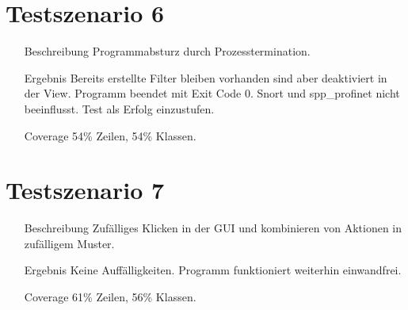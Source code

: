 \section{Testszenario 6}

\begin{enumerate}[leftmargin = *, align=parleft, labelsep=3cm]
  \item[Beschreibung] Programmabsturz durch Prozesstermination.
  \item[Ergebnis] Bereits erstellte Filter bleiben vorhanden sind aber deaktiviert in der View. Programm beendet mit Exit Code 0. Snort und spp\_profinet nicht beeinflusst. Test als Erfolg einzustufen.
  \item[Coverage] 54\% Zeilen, 54\% Klassen.
\end{enumerate} 

\section{Testszenario 7}

\begin{enumerate}[leftmargin = *, align=parleft, labelsep=3cm]
  \item[Beschreibung] Zufälliges Klicken in der GUI und kombinieren von Aktionen in zufälligem Muster.
  \item[Ergebnis] Keine Auffälligkeiten. Programm funktioniert weiterhin einwandfrei.
  \item[Coverage] 61\% Zeilen, 56\% Klassen.
\end{enumerate}